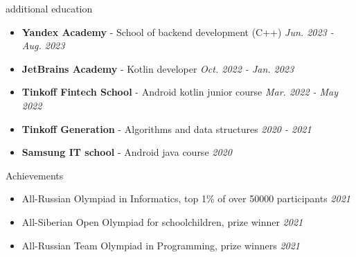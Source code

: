 \documentclass{resume}
\begin{document}
\begin{ResumeSection}{additional education}
    \newcommand{\school}[2]{\textbf{#1} - #2}
    \begin{itemize}
        \item \school{Yandex Academy}{School of backend development (C++)} \em\hfill{Jun. 2023 - Aug. 2023}\em
        \item \school{JetBrains Academy}{Kotlin developer} \em\hfill{Oct. 2022 - Jan. 2023}\em
        \item \school{Tinkoff Fintech School}{Android kotlin junior course}  \em\hfill{Mar. 2022 - May 2022}\em
        \item \school{Tinkoff Generation}{Algorithms and data structures} \em\hfill{2020 - 2021}\em
        \item \school{Samsung IT school}{Android java course} \em\hfill{2020}\em
    \end{itemize}
\end{ResumeSection}
\begin{ResumeSection}{Achievements}
\begin{itemize}
  \item All-Russian Olympiad in Informatics, top 1\% of over 50000 participants \em\hfill{2021}\em
  \item All-Siberian Open Olympiad for schoolchildren, prize winner \em\hfill{2021}\em
  \item All-Russian Team Olympiad in Programming, prize winners \em\hfill{2021}\em
\end{itemize}
\end{ResumeSection}
\end{document}
